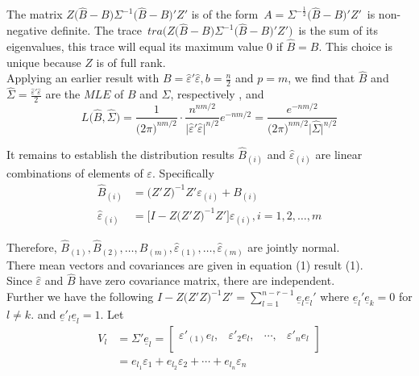 \documentclass[11pt,a4paper]{article}
\theoremstyle{definition}
\begin{document}
The matrix $Z\big(\widehat{B}-B\big)\Sigma^{-1}\big(\widehat{B}-B\big)'Z'$ is of the form \,$\displaystyle{A=\Sigma^{-\frac{1}{2}}\big(\widehat{B}-B\big)'Z'}\,$ is non-negative definite. The trace \,$\displaystyle{tra\big(Z\big(\widehat{B}-B\big)\Sigma^{-1}\big(\widehat{B}-B\big)'Z'\big)}\,$ is the sum of its eigenvalues, this trace will equal its maximum value 0 if $\widehat{B}=B$. This choice is unique because $Z$ is of full rank.\\
Applying an earlier result with $B=\widehat{\varepsilon}'\widehat{\varepsilon},  b=\frac{n}{2}$ and $p=m$, we find that $\widehat{B}$ and $\displaystyle{\widehat{\Sigma}=\frac{\widehat{\varepsilon}'\widehat{\varepsilon}}{2}}$ are the $MLE$ of $B$ and $\displaystyle{\Sigma}$, respectively , and 
\begin{equation}\tag{3}
L\big(\widehat{B},\widehat{\Sigma}\big) = \frac{1}{\big(2\pi\big)^{nm/2}}\cdot\frac{n^{nm/2}}{\big|\widehat{\varepsilon}'\widehat{\varepsilon}\big|^{n/2}}e^{-nm/2}=\frac{e^{-nm/2}}{\big(2\pi\big)^{nm/2}\big|\hat{\Sigma}\big|^{n/2}}
\end{equation}




It remains to establish the distribution results $\widehat{B}_{(i)}$ and $\widehat{\varepsilon}_{(i)}$ are linear combinations of elements of $\varepsilon$. Specifically
\begin{align*}
\widehat{B}_{(i)} & = \big(Z'Z\big)^{-1}Z'\varepsilon_{(i)} + B_{(i)}\\
\widehat{\varepsilon}_{(i)} & = \big[I- Z\big(Z'Z\big)^{-1}Z'\big]\varepsilon_{(i)},  i=1,2,\ldots,m
\end{align*}

Therefore, $\widehat{B}_{(1)}, \widehat{B}_{(2)},\ldots,\widehat{B}_{(m)}, \widehat{\varepsilon}_{(1)},\ldots, \widehat{\varepsilon}_{(m)}$ are jointly normal.\\
There mean vectors and covariances are given in equation (1) result (1).\\
Since $\widehat{\varepsilon}$ and $\widehat{B}$ have zero covariance matrix, there are independent.\\

Further we have the following $I-Z\big(Z'Z\big)^{-1}Z'=\sum\limits^{n-r-1}_{l=1}\underline{e}_l\underline{e}_l'$ where $\underline{e}_l'\underline{e}_k=0$ for $l\neq k$. and $\underline{e}'_l\underline{e}_l=1$. Let
\begin{align*}
V_l & = \Sigma'\underline{e}_l= \begin{bmatrix}
\varepsilon'_{(1)}e_l, & \varepsilon'_{2}e_l, & \cdots, & \varepsilon'_{n}e_l\\
\end{bmatrix}\\
& = e_{l_1}\varepsilon_1 + e_{l_2}\varepsilon_2 + \cdots+ e_{l_n}\varepsilon_n
\end{align*}
\end{document}
